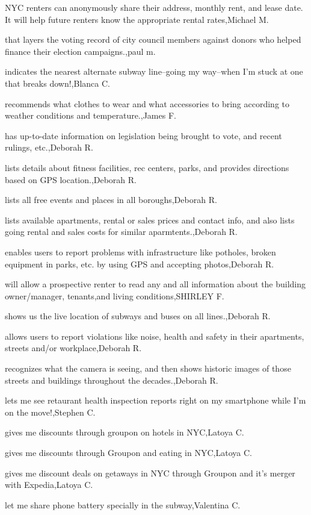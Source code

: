 \documentclass{article}
\begin{document}
NYC renters can anonymously share their address, monthly rent, and lease date. It will help future renters know the appropriate rental rates,Michael M.

that layers the voting record of city council members against donors who helped finance their election campaigns.,paul m.

indicates the nearest alternate subway line--going my way--when I'm stuck at one that breaks down!,Blanca C.

recommends what clothes to wear and what accessories to bring according to weather conditions and temperature.,James F.

has up-to-date information on legislation being brought to vote, and recent rulings, etc.,Deborah R.

lists details about fitness facilities, rec centers, parks, and provides directions based on GPS location.,Deborah R.

lists all free events and places in all boroughs,Deborah R.

lists available apartments, rental or sales prices and contact info, and also lists going rental and sales costs for similar aparmtents.,Deborah R.

enables users to report problems with infrastructure like potholes, broken equipment in parks, etc. by using GPS and accepting photos,Deborah R.

will allow a prospective renter to read any and all information about the building owner/manager, tenants,and living conditions,SHIRLEY F.

shows us the live location of subways and buses on all lines.,Deborah R.

allows users to report violations like noise, health and safety in their apartments, streets and/or workplace,Deborah R.

recognizes what the camera is seeing, and then shows historic images of those streets and buildings throughout the decades.,Deborah R.

lets me see retaurant health inspection reports right on my smartphone while I'm on the move!,Stephen C.

gives me discounts through groupon on hotels in NYC,Latoya C.

gives me discounts through Groupon and  eating in NYC,Latoya C.

gives me discount deals on getaways  in NYC through Groupon and it's merger with Expedia,Latoya C.

let me share phone battery specially in the subway,Valentina C.
\end{document}

